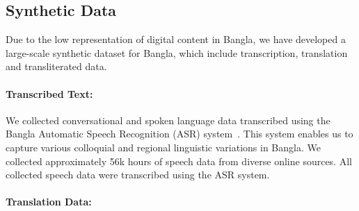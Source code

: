 

\subsection{Synthetic Data}
Due to the low representation of digital content in Bangla, we have developed a large-scale synthetic dataset for Bangla, which include transcription, translation and transliterated data. 

\paragraph{Transcribed Text:}  
We collected conversational and spoken language data transcribed using the Bangla Automatic Speech Recognition (ASR) system~\cite{nandi-etal-2023-pseudo}. This system enables us to capture various colloquial and regional linguistic variations in Bangla. We collected approximately 56k hours of speech data from diverse online sources. All collected speech data were transcribed using the ASR system.

\paragraph{Translation Data:}

